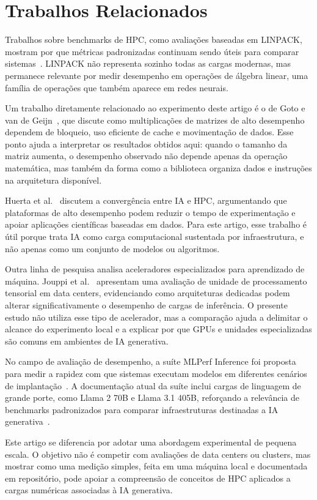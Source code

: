 \section{Trabalhos Relacionados}
\label{sec:relacionados}

Trabalhos sobre benchmarks de HPC, como avaliações baseadas em LINPACK, mostram por que métricas padronizadas continuam sendo úteis para comparar sistemas~\cite{dongarra2003linpack}. LINPACK não representa sozinho todas as cargas modernas, mas permanece relevante por medir desempenho em operações de álgebra linear, uma família de operações que também aparece em redes neurais.

Um trabalho diretamente relacionado ao experimento deste artigo é o de Goto e van de Geijn~\cite{goto2008anatomy}, que discute como multiplicações de matrizes de alto desempenho dependem de bloqueio, uso eficiente de cache e movimentação de dados. Esse ponto ajuda a interpretar os resultados obtidos aqui: quando o tamanho da matriz aumenta, o desempenho observado não depende apenas da operação matemática, mas também da forma como a biblioteca organiza dados e instruções na arquitetura disponível.

Huerta et al.~\cite{huerta2020convergence} discutem a convergência entre IA e HPC, argumentando que plataformas de alto desempenho podem reduzir o tempo de experimentação e apoiar aplicações científicas baseadas em dados. Para este artigo, esse trabalho é útil porque trata IA como carga computacional sustentada por infraestrutura, e não apenas como um conjunto de modelos ou algoritmos.

Outra linha de pesquisa analisa aceleradores especializados para aprendizado de máquina. Jouppi et al.~\cite{jouppi2017tpu} apresentam uma avaliação de unidade de processamento tensorial em data centers, evidenciando como arquiteturas dedicadas podem alterar significativamente o desempenho de cargas de inferência. O presente estudo não utiliza esse tipo de acelerador, mas a comparação ajuda a delimitar o alcance do experimento local e a explicar por que GPUs e unidades especializadas são comuns em ambientes de IA generativa.

No campo de avaliação de desempenho, a suíte MLPerf Inference foi proposta para medir a rapidez com que sistemas executam modelos em diferentes cenários de implantação~\cite{reddi2019mlperf}. A documentação atual da suíte inclui cargas de linguagem de grande porte, como Llama 2 70B e Llama 3.1 405B, reforçando a relevância de benchmarks padronizados para comparar infraestruturas destinadas a IA generativa~\cite{mlperfInferenceDocs}.

Este artigo se diferencia por adotar uma abordagem experimental de pequena escala. O objetivo não é competir com avaliações de data centers ou clusters, mas mostrar como uma medição simples, feita em uma máquina local e documentada em repositório, pode apoiar a compreensão de conceitos de HPC aplicados a cargas numéricas associadas à IA generativa.
